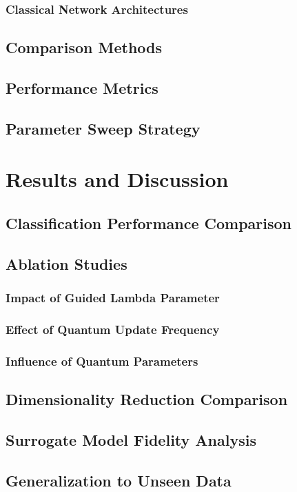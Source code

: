 \documentclass[conference]{IEEEtran}
\begin{document}
\subsubsection{Classical Network Architectures}
\subsection{Comparison Methods}
\subsection{Performance Metrics}
\subsection{Parameter Sweep Strategy}

\section{Results and Discussion}
\subsection{Classification Performance Comparison}
\subsection{Ablation Studies}
\subsubsection{Impact of Guided Lambda Parameter}
\subsubsection{Effect of Quantum Update Frequency}
\subsubsection{Influence of Quantum Parameters}
\subsection{Dimensionality Reduction Comparison}
\subsection{Surrogate Model Fidelity Analysis}
\subsection{Generalization to Unseen Data}
\end{document}
